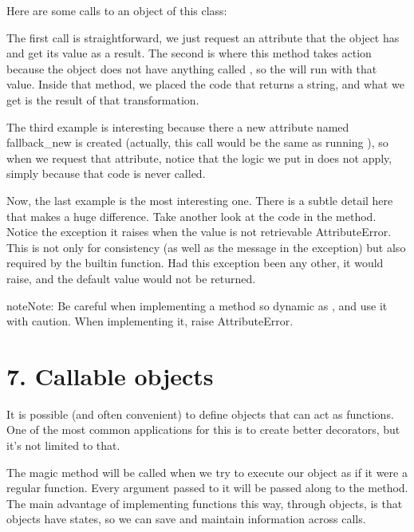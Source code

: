 \documentclass[a4paper,10pt,english]{sphinxmanual}
\begin{document}
Here are some calls to an object of this class:

The first call is straightforward, we just request an attribute that the object has and get its value as a result. The
second is where this method takes action because the object does not have anything called , so the
 will run with that value. Inside that method, we placed the code that returns a string, and what we get
is the result of that transformation.

The third example is interesting because there a new attribute named fallback\_new is created (actually, this call would
be the same as running ), so when we request that attribute, notice that the logic we
put in  does not apply, simply because that code is never called.

Now, the last example is the most interesting one. There is a subtle detail here that makes a huge difference. Take
another look at the code in the  method. Notice the exception it raises when the value is not retrievable
AttributeError. This is not only for consistency (as well as the message in the exception) but also required by the
builtin  function. Had this exception been any other, it would raise, and the default value would not be
returned.

\begin{sphinxadmonition}{note}{Note:}
Be careful when implementing a method so dynamic as , and use it with caution. When implementing it,
raise AttributeError.
\end{sphinxadmonition}


\section{7. Callable objects}
\label{\detokenize{chapters/2_pythonic_code/index:callable-objects}}
It is possible (and often convenient) to define objects that can act as functions. One of the most common applications
for this is to create better decorators, but it’s not limited to that.

The magic method  will be called when we try to execute our object as if it were a regular function. Every
argument passed to it will be passed along to the  method. The main advantage of implementing functions this way, through objects, is that objects have states, so we can save and
maintain information across calls.
\end{document}
